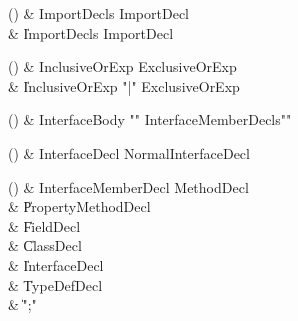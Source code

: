 \begin{bbgrammarappendix}

() & ImportDecls \label{prod:ImportDecls}  \: ImportDecl  \\

 &    \| ImportDecls ImportDecl \\

\end{bbgrammarappendix}

\begin{bbgrammarappendix}

() & InclusiveOrExp \label{prod:InclusiveOrExp}  \: ExclusiveOrExp  \\

 &    \| InclusiveOrExp \xcd"|" ExclusiveOrExp \\

\end{bbgrammarappendix}

\begin{bbgrammarappendix}

() & InterfaceBody \label{prod:InterfaceBody}  \: \xcd"{" InterfaceMemberDecls\opt \xcd"}"  \\


\end{bbgrammarappendix}

\begin{bbgrammarappendix}

() & InterfaceDecl \label{prod:InterfaceDecl}  \: NormalInterfaceDecl  \\


\end{bbgrammarappendix}

\begin{bbgrammarappendix}

() & InterfaceMemberDecl \label{prod:InterfaceMemberDecl}  \: MethodDecl  \\

 &    \| PropertyMethodDecl \\
 &    \| FieldDecl \\
 &    \| ClassDecl \\
 &    \| InterfaceDecl \\
 &    \| TypeDefDecl \\
 &    \| \xcd";" \\

\end{bbgrammarappendix}

